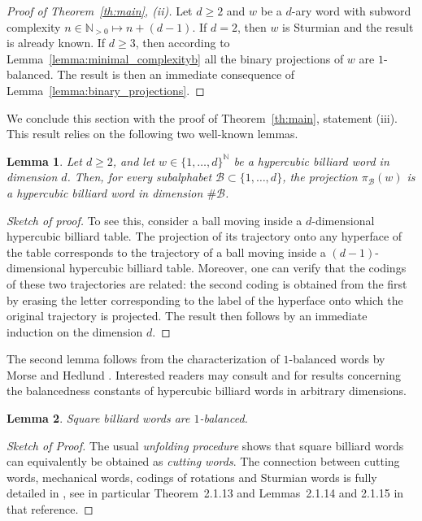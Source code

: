 \documentclass{template_arxiv}
\newtheorem{lemma}{Lemma}%
\theoremstyle{definition}
\newcommand{\N}{\mathbb{N}}
\newcommand{\B}{\mathcal{B}}
\begin{document}
\begin{proof}[Proof of Theorem~\ref{th:main}, (ii)]
Let $d\geq 2$ and $w$ be a $d$-ary word with subword complexity $n\in\N_{>0}\mapsto n+(d-1)$. If $d=2$, then $w$ is Sturmian and the result is already known. If $d\geq 3$, then according to Lemma~\ref{lemma:minimal_complexityb} all the binary projections of $w$ are $1$-balanced. The result is then an immediate consequence of Lemma~\ref{lemma:binary_projections}.
\end{proof}

We conclude this section with the proof of Theorem~\ref{th:main}, statement (iii). This result relies on the following two well-known lemmas.

\begin{lemma}\label{lemma:projection_billiard}
Let $d\geq 2$, and let $w\in\{1,\ldots,d\}^\N$ be a hypercubic billiard word in dimension $d$. Then, for every subalphabet $\B\subset\{1,\ldots,d\}$, the projection $\pi_\B(w)$ is a hypercubic billiard word in dimension $\#\B$.
\end{lemma}

\begin{proof}[Sketch of proof]
To see this, consider a ball moving inside a $d$-dimensional hypercubic billiard table. The projection of its trajectory onto any hyperface of the table corresponds to the trajectory of a ball moving inside a $(d-1)$-dimensional hypercubic billiard table. Moreover, one can verify that the codings of these two trajectories are related: the second coding is obtained from the first by erasing the letter corresponding to the label of the hyperface onto which the original trajectory is projected. The result then follows by an immediate induction on the dimension $d$.
\end{proof}

The second lemma follows from the characterization of $1$-balanced words by Morse and Hedlund \cite{MH40}. Interested readers may consult \cite[Section~6]{Vui03} and \cite{AV22,AV24} for results concerning the balancedness constants of hypercubic billiard words in arbitrary dimensions.

\begin{lemma}\label{lemma:balance_square_billiard}
Square billiard words are $1$-balanced.
\end{lemma}

\begin{proof}[Sketch of Proof]
The usual \emph{unfolding procedure} shows that square billiard words can equivalently be obtained as \emph{cutting words}. The connection between cutting words, mechanical words, codings of rotations and Sturmian words is fully detailed in \cite[Chapter~2, Section~2.1]{Loth02}, see in particular Theorem~2.1.13 and Lemmas~2.1.14 and 2.1.15 in that reference.
\end{proof}
\end{document}
